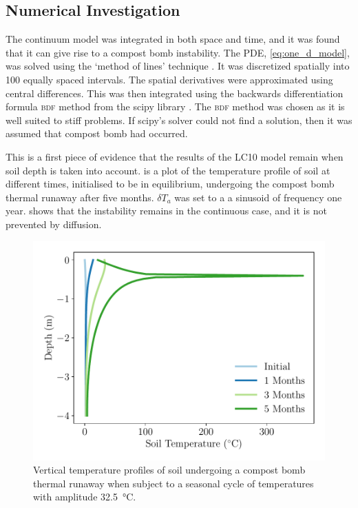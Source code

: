 \subsection{Numerical Investigation}
\label{sec:numerical_investigation}
The continuum model was integrated in both space and time, and it was found that it can give rise to a compost bomb instability.
The PDE, \cref{eq:one_d_model}, was solved using the `method of lines' technique \parencite{Schiesser2012}. It was discretized spatially into 100 equally spaced intervals.
The spatial derivatives were approximated using central differences. This was then integrated using
the backwards differentiation formula \textsc{bdf} method from the scipy library \parencite{Virtanen2020}. The \textsc{bdf} method was chosen as it is well suited to stiff problems.
If scipy's solver could not find a solution, then it was assumed that compost bomb had occurred.

This is a first piece of evidence that the results of the LC10 model remain when soil depth is taken into account. 
is a plot of the temperature profile of soil at different times, initialised to be in equilibrium, undergoing the compost bomb thermal runaway after five months.
$\delta T_a$ was set to a  a sinusoid of frequency one year.  shows that
the instability remains in the continuous case, and it is not prevented by diffusion.

\begin{figure}
  \centering
  \includegraphics[scale=0.5,keepaspectratio]{seasonal_cycle_profiles}
  \caption[Vertical profile of soil temperature]{Vertical temperature profiles of soil undergoing a compost bomb thermal runaway when subject to a seasonal cycle of temperatures with amplitude \SI{32.5}{\degreeCelsius}.}
  \label{fig:vertical_profiles}
\end{figure}
